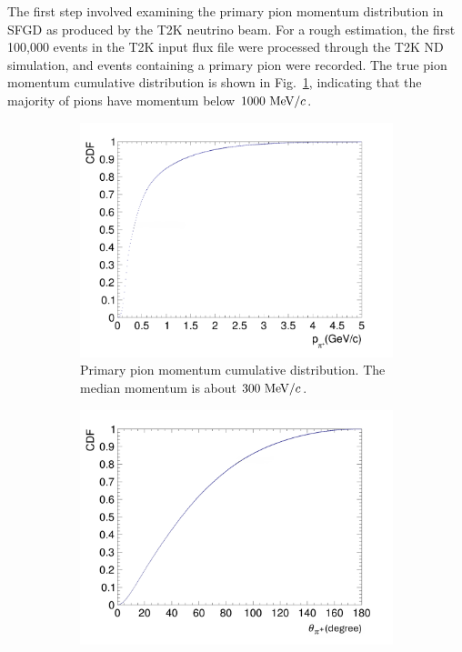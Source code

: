           The first step involved examining the primary pion momentum distribution in SFGD as produced by the T2K neutrino beam. 
          For a rough estimation, the first 100,000 events in the T2K input flux file were processed through the T2K ND simulation, and events containing a primary pion were recorded. 
          The true pion momentum cumulative distribution is shown in Fig.~\ref{subfig:pi-mom-cum}, indicating that the majority of pions have momentum below $1000~\textrm{MeV}/c$.

          \begin{figure}[t]
               \centering
               \begin{subfigure}{\dbfigwid\textwidth}
                    \includegraphics[width=\textwidth]{figures/sel/pion_mom_pdf.png}
                    \caption{Primary pion momentum cumulative distribution. The median momentum is about $300~\textrm{MeV}/c$.}
                    \label{subfig:pi-mom-cum}
               \end{subfigure}
               \begin{subfigure}{\dbfigwid\textwidth}
                    \includegraphics[width=\textwidth]{figures/sel/pion_theta_pdf.png}

\end{subfigure}
\end{figure}
